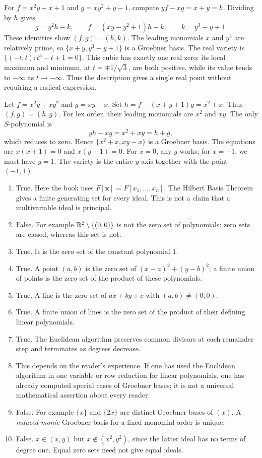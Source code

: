 For $f=x^2y+x+1$ and $g=xy^2+y-1$, compute $yf-xg=x+y=h$. Dividing by $h$ gives
\[g=y^2h-k,\qquad f=(xy-y^2+1)h+k,\qquad k=y^3-y+1.\]
These identities show $(f,g)=(h,k)$. The leading monomials $x$ and $y^3$ are relatively prime, so $\{x+y,y^3-y+1\}$ is a Groebner basis.
The real variety is $\{(-t,t):t^3-t+1=0\}$. This cubic has exactly one real zero: its local maximum and minimum, at $t=\mp1/\sqrt3$, are both positive, while its value tends to $-\infty$ as $t\to-\infty$. Thus the description gives a single real point without requiring a radical expression.

Let $f=x^2y+xy^2$ and $g=xy-x$. Set $h=f-(x+y+1)g=x^2+x$. Thus $(f,g)=(h,g)$. For lex order, their leading monomials are $x^2$ and $xy$. The only $S$-polynomial is
\[yh-xg=x^2+xy=h+g,\]
which reduces to zero. Hence $\{x^2+x,xy-x\}$ is a Groebner basis.
The equations are $x(x+1)=0$ and $x(y-1)=0$. For $x=0$, any $y$ works; for $x=-1$, we must have $y=1$. The variety is the entire $y$-axis together with the point $(-1,1)$.

\begin{enumerate}[label=(\alph*)]
\item True. Here the book uses $F[\mathbf{x}]=F[x_1,\ldots,x_n]$. The Hilbert Basis Theorem gives a finite generating set for every ideal. This is not a claim that a multivariable ideal is principal.
\item False. For example $\mathbb{R}^2\setminus\{(0,0)\}$ is not the zero set of polynomials: zero sets are closed, whereas this set is not.
\item True. It is the zero set of the constant polynomial $1$.
\item True. A point $(a,b)$ is the zero set of $(x-a)^2+(y-b)^2$; a finite union of points is the zero set of the product of these polynomials.
\item True. A line is the zero set of $ax+by+c$ with $(a,b)\ne(0,0)$.
\item True. A finite union of lines is the zero set of the product of their defining linear polynomials.
\item True. The Euclidean algorithm preserves common divisors at each remainder step and terminates as degrees decrease.
\item This depends on the reader's experience. If one has used the Euclidean algorithm in one variable or row reduction for linear polynomials, one has already computed special cases of Groebner bases; it is not a universal mathematical assertion about every reader.
\item False. For example $\{x\}$ and $\{2x\}$ are distinct Groebner bases of $(x)$. A \emph{reduced monic} Groebner basis for a fixed monomial order is unique.
\item False. $x\in(x,y)$ but $x\notin(x^2,y^2)$, since the latter ideal has no terms of degree one. Equal zero sets need not give equal ideals.
\end{enumerate}

